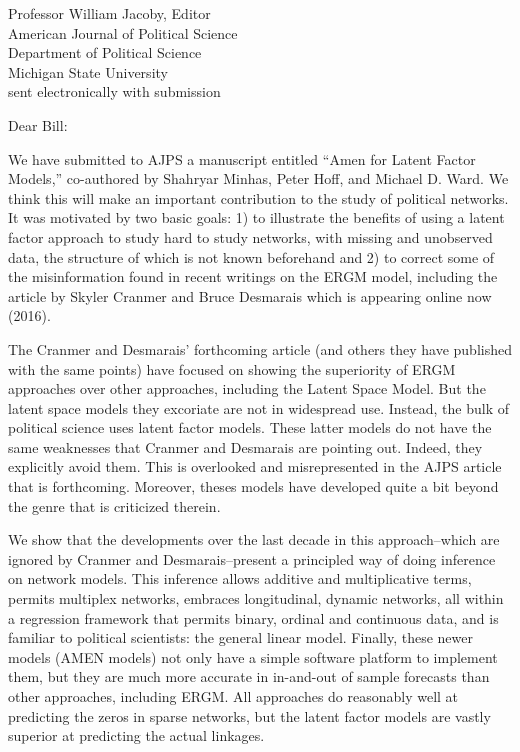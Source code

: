 \documentclass[12pt]{letter}
\begin{document}
\begin{letter}
{Professor William Jacoby, Editor\\
American Journal of Political Science\\
Department of Political Science\\
Michigan State University\\
sent electronically with submission}


\opening{Dear Bill:}

We have submitted to AJPS a manuscript entitled ``Amen for Latent Factor Models,'' co-authored by Shahryar Minhas, Peter Hoff, and Michael D. Ward.  We think this will make an important contribution to the study of political networks.  It was motivated by two basic goals: 1) to illustrate the benefits of using a latent factor approach to study hard to study networks, with missing and unobserved data, the structure of which is not known beforehand and 2) to correct some of the misinformation found in recent writings on the ERGM model, including the article by Skyler Cranmer and Bruce Desmarais which is appearing online now (2016).

The Cranmer and Desmarais' forthcoming article  (and others they have published with the same points)  have focused on showing the superiority of ERGM approaches over other approaches, including the Latent Space Model.  But the latent space models they excoriate are not in widespread use. Instead, the bulk of political science uses latent factor models. These latter models do not have the same weaknesses that Cranmer and Desmarais are pointing out. Indeed, they explicitly avoid them.  This is overlooked and misrepresented in the AJPS article that is forthcoming. Moreover, theses models have developed quite a bit beyond the genre that is criticized therein.  

We show that the developments over the last decade in this approach--which are ignored by Cranmer and Desmarais--present a principled way of doing inference on network models. This inference allows additive and multiplicative terms, permits multiplex networks, embraces longitudinal, dynamic networks, all within a regression framework that permits binary, ordinal and continuous data, and is familiar to political scientists: the general linear model. Finally, these newer models (AMEN models) not only have a simple software platform to implement them, but they are much more accurate in in-and-out of sample forecasts than other approaches, including ERGM.  All approaches do reasonably well at predicting the zeros in sparse networks, but the latent factor models are vastly superior at predicting the actual linkages. 


\end{letter}
\end{document}
